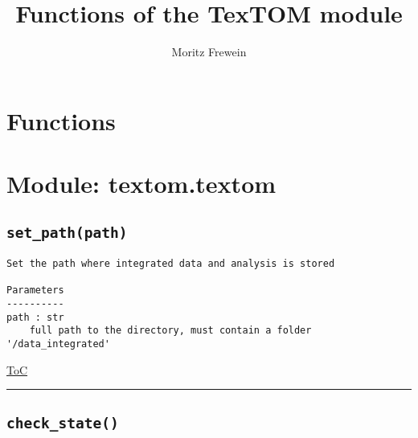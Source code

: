\documentclass{article}
\title{Functions of the TexTOM module}
\author{Moritz Frewein}
\begin{document}
\maketitle
\label{toc}
\tableofcontents

                
\subsectionfont{\large\ttfamily\raggedright}


\section{Functions}
\section*{Module: textom.textom}

\subsection*{\texttt{set\_path(path)}}

\begin{lstlisting}[language=docstring]
Set the path where integrated data and analysis is stored

Parameters
----------
path : str
    full path to the directory, must contain a folder '/data_integrated'
\end{lstlisting}

\begin{flushright}

\hyperref[toc]{ToC}

\end{flushright}



\vspace{5mm}

\hrule

\subsection*{\texttt{check\_state()}}
\end{document}
